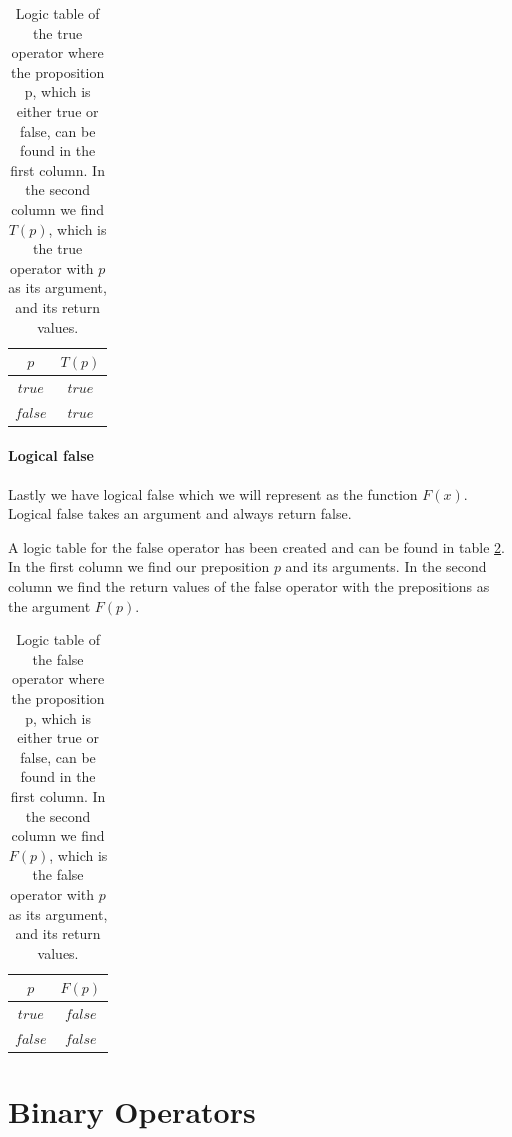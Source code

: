         \begin{table}[h!]
            \centering
            \begin{tabular}{|c|c|}
            	\hline
            	  $p$   & $T(p)$ \\ \hline
            	$true$  & $true$ \\ \hline
            	$false$ & $true$ \\ \hline
            \end{tabular}
            \caption{Logic table of the true operator where the proposition p, which is either true or false, can be found in the first column. In the second column we find $T(p)$, which is the true operator with $p$ as its argument, and its return values.}
            \label{LogicTable:True}
        \end{table}
    
    \subsubsection{Logical false}
        
        Lastly we have logical false which we will represent as the function $F(x)$. Logical false takes an argument and always return false.
        
        A logic table for the false operator has been created and can be found in table \ref{LogicTable:False}. In the first column we find our preposition $p$ and its arguments. In the second column we find the return values of the false operator with the prepositions as the argument $F(p)$.
        
        \begin{table}[h!]
            \centering
            \begin{tabular}{|c|c|}
            	\hline
            	  $p$   & $F(p)$  \\ \hline
            	$true$  & $false$ \\ \hline
            	$false$ & $false$ \\ \hline
            \end{tabular}
            \caption{Logic table of the false operator where the proposition p, which is either true or false, can be found in the first column. In the second column we find $F(p)$, which is the false operator with $p$ as its argument, and its return values.}
            \label{LogicTable:False}
    \end{table}

\chapter{Binary Operators}
\label{appendix:Binaray_Operators}

